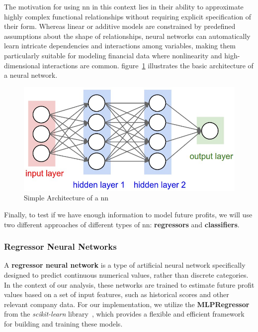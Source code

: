 \documentclass[11pt,english,a4paper,hidelinks]{book}
\begin{document}
\vspace{0.5cm}
\noindent The motivation for using \acrshort{nn} in this context lies in their ability to approximate highly complex functional relationships without requiring explicit specification of their form. Whereas linear or additive models are constrained by predefined assumptions about the shape of relationships, neural networks can automatically learn intricate dependencies and interactions among variables, making them particularly suitable for modeling financial data where nonlinearity and high-dimensional interactions are common. figure~\ref{fig:nn-basic-schema} illustrates the basic architecture of a neural network.

\vspace{0.5cm}
\begin{figure}[H]
    \centering
    \includegraphics[width=1\textwidth]{images/code/models/neural_network/basic_schema.png}
    \caption{Simple Architecture of a \acrshort{nn}}
    \label{fig:nn-basic-schema}
\end{figure}

\noindent Finally, to test if we have enough information to model future profits, we will use two different approaches of different types of \acrshort{nn}: \textbf{regressors} and \textbf{classifiers}.

\subsubsection{Regressor Neural Networks}

\noindent
A \textbf{regressor neural network} is a type of artificial neural network specifically designed to predict continuous numerical values, rather than discrete categories. In the context of our analysis, these networks are trained to estimate future profit values based on a set of input features, such as historical scores and other relevant company data. For our implementation, we utilize the \textbf{MLPRegressor} from the \textit{scikit-learn} library~\cite{scikit2025mlpregressor}, which provides a flexible and efficient framework for building and training these models.
\end{document}
